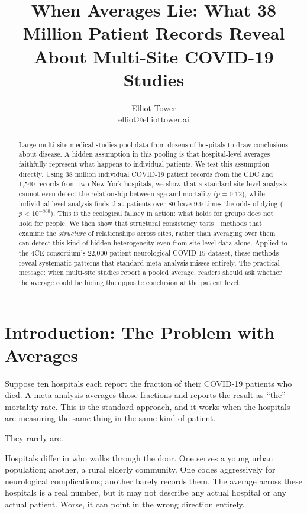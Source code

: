 \documentclass{article}
\title{When Averages Lie: What 38 Million Patient Records Reveal\\About Multi-Site COVID-19 Studies}
\author{\name Elliot Tower \\
      \email elliot@elliottower.ai}
\begin{document}
\maketitle

\begin{abstract}
Large multi-site medical studies pool data from dozens of hospitals to draw
conclusions about disease.  A hidden assumption in this pooling is that
hospital-level averages faithfully represent what happens to individual
patients.  We test this assumption directly.  Using 38 million individual
COVID-19 patient records from the CDC and 1,540 records from two New York
hospitals, we show that a standard site-level analysis cannot even detect the
relationship between age and mortality ($p = 0.12$), while individual-level
analysis finds that patients over 80 have 9.9 times the odds of dying ($p <
10^{-300}$).  This is the ecological fallacy in action: what holds for groups
does not hold for people.  We then show that structural consistency
tests---methods that examine the \emph{structure} of relationships across
sites, rather than averaging over them---can detect this kind of hidden
heterogeneity even from site-level data alone.  Applied to the 4CE
consortium's 22,000-patient neurological COVID-19 dataset, these methods
reveal systematic patterns that standard meta-analysis misses entirely.  The
practical message: when multi-site studies report a pooled average, readers
should ask whether the average could be hiding the opposite conclusion at the
patient level.
\end{abstract}


\section{Introduction: The Problem with Averages}

Suppose ten hospitals each report the fraction of their COVID-19 patients who
died.  A meta-analysis averages those fractions and reports the result as
``the'' mortality rate.  This is the standard approach, and it works when the
hospitals are measuring the same thing in the same kind of patient.

They rarely are.

Hospitals differ in who walks through the door.  One serves a young urban
population; another, a rural elderly community.  One codes aggressively for
neurological complications; another barely records them.  The average across
these hospitals is a real number, but it may not describe any actual hospital
or any actual patient.  Worse, it can point in the wrong direction entirely.
\end{document}
